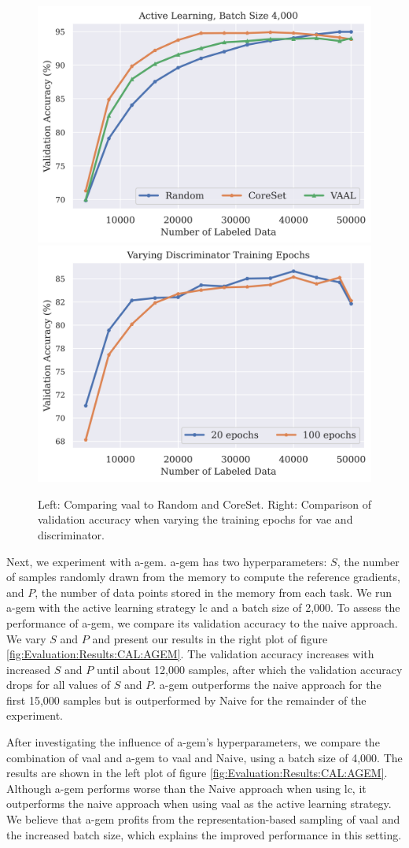 \begin{figure}[h]
    \centering
    \includegraphics[width=0.46\linewidth]{images/results_CAL/vaal_al.png} \hfill
    \includegraphics[width=0.46\linewidth]{images/results_CAL/vaal_disc_epochs.png}
    \caption[Continual active learning using our custom Replay strategy]{Left: Comparing \gls{vaal} to Random and CoreSet.
    Right: Comparison of validation accuracy when varying the training epochs for \gls{vae} and discriminator.}
    \label{fig:Evaluation:CAL:VAAL}
\end{figure}

Next, we experiment with \gls{a-gem}. \gls{a-gem} has two hyperparameters: $S$,  the number of samples randomly drawn from the memory to compute the reference
gradients, and $P$, the number of data points stored in the memory from each task. We run \gls{a-gem} with the active learning strategy \gls{lc} and a batch size
of 2,000. To assess the performance of \gls{a-gem}, we compare its validation accuracy to the naive approach. We vary $S$ and $P$ and present our results in the right plot
of figure \ref{fig:Evaluation:Results:CAL:AGEM}. The validation accuracy increases with increased $S$ and $P$ until about 12,000 samples, after which the validation 
accuracy drops for all values of $S$ and $P$. \gls{a-gem} outperforms the naive approach for the first 15,000 samples but is outperformed by Naive for the remainder of
the experiment. \par
After investigating the influence of \gls{a-gem}'s hyperparameters, we compare the combination of \gls{vaal} and \gls{a-gem} to \gls{vaal} and Naive, using a batch size
of 4,000. The results are shown in the left plot of figure \ref{fig:Evaluation:Results:CAL:AGEM}. Although \gls{a-gem} performs worse than the Naive
approach when using \gls{lc}, it outperforms the naive approach when using \gls{vaal} as the active learning strategy. We believe that \gls{a-gem} profits from the 
representation-based sampling of \gls{vaal} and the increased batch size, which explains the improved performance in this setting. \par

